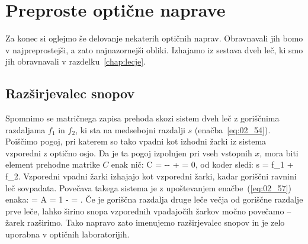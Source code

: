 \section{Preproste optične naprave}
Za konec si oglejmo še delovanje nekaterih optičnih naprav. Obravnavali jih bomo 
v najpreprostejši, a zato najnazornejši obliki. Izhajamo iz sestava dveh leč, ki 
smo jih obravnavali v razdelku~\ref{chap:lecje}. 

\subsection*{Razširjevalec snopov}
Spomnimo se matričnega zapisa prehoda skozi sistem dveh leč z goriščnima razdaljama
$f_1$ in $f_2$, ki sta na medsebojni razdalji $s$ (enačba~\ref{eq:02_54}). Poiščimo
pogoj, pri katerem so tako vpadni kot izhodni žarki iz sistema vzporedni z optično osjo.
Da je ta pogoj izpolnjen pri vseh vstopnih $x$, mora biti 
element prehodne matrike $C$ enak nič:
\beq
C = -- +  = 0,
\label{eq:02_65}
\eeq
od koder sledi:
\beq
s = f_1 + f_2.
\label{eq:02_57}
\eeq
Vzporedni vpadni žarki izhajajo kot vzporedni žarki, kadar goriščni ravnini leč sovpadata.
Povečava takega sistema je z upoštevanjem enačbe~(\ref{eq:02_57}) enaka:
\beq
{} = A = 1 -  = .
\label{eq:02_58}
\eeq
Če je goriščna razdalja druge leče večja od goriščne razdalje prve leče, 
lahko širino snopa vzporednih vpadajočih žarkov močno povečamo -- žarek razširimo.
Tako napravo zato imenujemo razširjevalec snopov in je zelo uporabna v optičnih laboratorijih.

